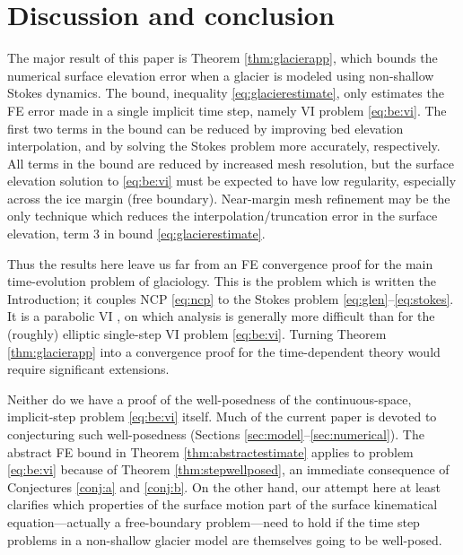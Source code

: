 \documentclass[hidelinks,onefignum,onetabnum,final]{siamart220329}  %
\begin{document}
\section{Discussion and conclusion} \label{sec:conclusion}

The major result of this paper is Theorem \ref{thm:glacierapp}, which bounds the numerical surface elevation error when a glacier is modeled using non-shallow Stokes dynamics.  The bound, inequality \eqref{eq:glacierestimate}, only estimates the FE error made in a single implicit time step, namely VI problem \eqref{eq:be:vi}.  The first two terms in the bound can be reduced by improving bed elevation interpolation, and by solving the Stokes problem more accurately, respectively.  All terms in the bound are reduced by increased mesh resolution, but the surface elevation solution to \eqref{eq:be:vi} must be expected to have low regularity, especially across the ice margin (free boundary).  Near-margin mesh refinement may be the only technique which reduces the interpolation/truncation error in the surface elevation, term 3 in bound \eqref{eq:glacierestimate}.

Thus the results here leave us far from an FE convergence proof for the main time-evolution problem of glaciology.  This is the problem which is written the Introduction; it couples NCP \eqref{eq:ncp} to the Stokes problem \eqref{eq:glen}--\eqref{eq:stokes}.  It is a parabolic VI \cite{Glowinski1984}, on which analysis is generally more difficult than for the (roughly) elliptic single-step VI problem \eqref{eq:be:vi}.  Turning Theorem \ref{thm:glacierapp} into a convergence proof for the time-dependent theory would require significant extensions.

Neither do we have a proof of the well-posedness of the continuous-space, implicit-step problem \eqref{eq:be:vi} itself.  Much of the current paper is devoted to conjecturing such well-posedness (Sections \ref{sec:model}--\ref{sec:numerical}).  The abstract FE bound in Theorem \ref{thm:abstractestimate} applies to problem \eqref{eq:be:vi} because of Theorem \ref{thm:stepwellposed}, an immediate consequence of Conjectures \ref{conj:a} and \ref{conj:b}.  On the other hand, our attempt here at least clarifies which properties of the surface motion part of the surface kinematical equation---actually a free-boundary problem---need to hold if the time step problems in a non-shallow glacier model are themselves going to be well-posed.
\end{document}
